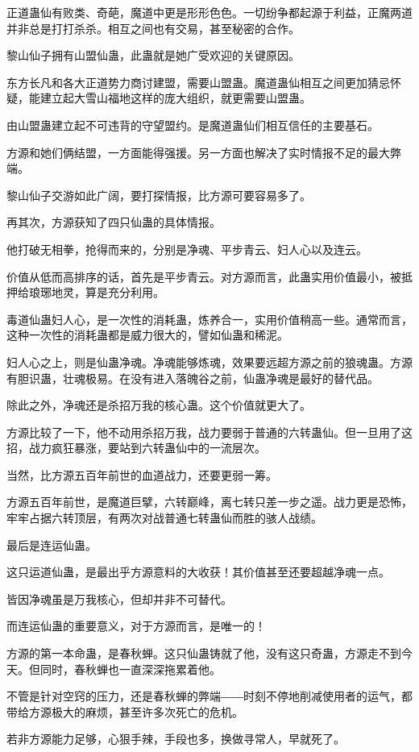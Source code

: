 \begin{this_body}
正道蛊仙有败类、奇葩，魔道中更是形形色色。一切纷争都起源于利益，正魔两道并非总是打打杀杀。相互之间也有交易，甚至秘密的合作。

黎山仙子拥有山盟仙蛊，此蛊就是她广受欢迎的关键原因。

东方长凡和各大正道势力商讨建盟，需要山盟蛊。魔道蛊仙相互之间更加猜忌怀疑，能建立起大雪山福地这样的庞大组织，就更需要山盟蛊。

由山盟蛊建立起不可违背的守望盟约。是魔道蛊仙们相互信任的主要基石。

方源和她们俩结盟，一方面能得强援。另一方面也解决了实时情报不足的最大弊端。

黎山仙子交游如此广阔，要打探情报，比方源可要容易多了。

再其次，方源获知了四只仙蛊的具体情报。

他打破无相拳，抢得而来的，分别是净魂、平步青云、妇人心以及连云。

价值从低而高排序的话，首先是平步青云。对方源而言，此蛊实用价值最小，被抵押给琅琊地灵，算是充分利用。

毒道仙蛊妇人心，是一次性的消耗蛊，炼养合一，实用价值稍高一些。通常而言，这种一次性的消耗蛊都是威力很大的，譬如仙蛊和稀泥。

妇人心之上，则是仙蛊净魂。净魂能够炼魂，效果要远超方源之前的狼魂蛊。方源有胆识蛊，壮魂极易。在没有进入落魄谷之前，仙蛊净魂是最好的替代品。

除此之外，净魂还是杀招万我的核心蛊。这个价值就更大了。

方源比较了一下，他不动用杀招万我，战力要弱于普通的六转蛊仙。但一旦用了这招，战力疯狂暴涨，要站到六转蛊仙中的一流层次。

当然，比方源五百年前世的血道战力，还要更弱一筹。

方源五百年前世，是魔道巨擘，六转巅峰，离七转只差一步之遥。战力更是恐怖，牢牢占据六转顶层，有两次对战普通七转蛊仙而胜的骇人战绩。

最后是连运仙蛊。

这只运道仙蛊，是最出乎方源意料的大收获！其价值甚至还要超越净魂一点。

皆因净魂虽是万我核心，但却并非不可替代。

而连运仙蛊的重要意义，对于方源而言，是唯一的！

方源的第一本命蛊，是春秋蝉。这只仙蛊铸就了他，没有这只奇蛊，方源走不到今天。但同时，春秋蝉也一直深深拖累着他。

不管是针对空窍的压力，还是春秋蝉的弊端――时刻不停地削减使用者的运气，都带给方源极大的麻烦，甚至许多次死亡的危机。

若非方源能力足够，心狠手辣，手段也多，换做寻常人，早就死了。


\end{this_body}
